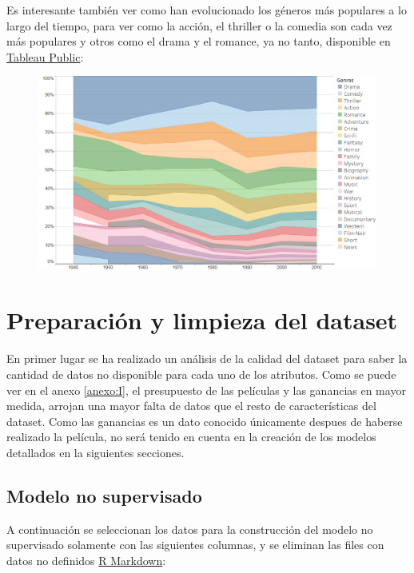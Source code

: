\documentclass{article}
\begin{document}
Es interesante también ver como han evolucionado los géneros más populares a lo largo del tiempo, para ver como la acción, el thriller o la comedia son cada vez más populares y otros como el drama y el romance, ya no tanto, disponible en \href{https://public.tableau.com/profile/javier6580\#!/vizhome/proyecto_fin_de_master_genre/rating_genre}{Tableau Public}:

\begin{figure}[h]
\centering
\includegraphics[width=4.5in,clip,keepaspectratio]{./images/genre_year}
\end{figure}

\clearpage

\section{Preparación y limpieza del dataset}

En primer lugar se ha realizado un análisis de la calidad del dataset para saber la cantidad de datos no disponible para cada uno de los atributos. Como se puede ver en el anexo \ref{anexo:I}, el presupuesto de las películas y las ganancias en mayor medida, arrojan una mayor falta de datos que el resto de características del dataset. Como las ganancias es un dato conocido únicamente despues de haberse realizado la película, no será tenido en cuenta en la creación de los modelos detallados en la siguientes secciones. 

\subsection{Modelo no supervisado}

A continuación se seleccionan los datos para la construcción del modelo no supervisado solamente con las siguientes columnas, y se eliminan las files con datos no definidos \href{https://github.com/pozueco/proyecto_fin_de_master/blob/master/clean_dataset.md}{R Markdown}:
\end{document}
